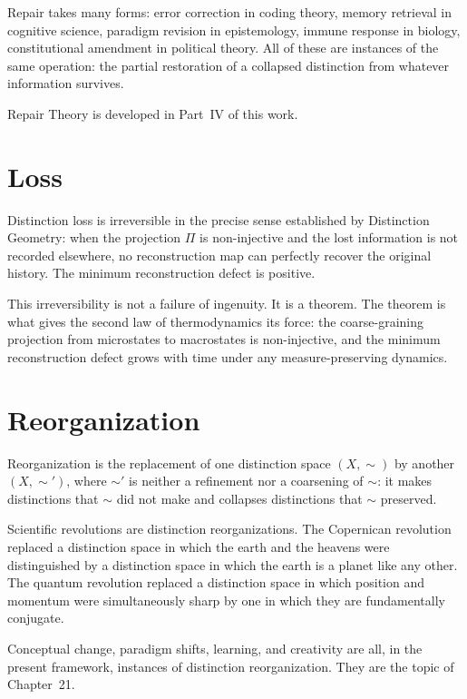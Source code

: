 \documentclass[12pt,a4paper]{book}
\theoremstyle{remark}
\theoremstyle{definition}
\begin{document}
Repair takes many forms: error correction in coding theory, memory
retrieval in cognitive science, paradigm revision in epistemology,
immune response in biology, constitutional amendment in political theory.
All of these are instances of the same operation: the partial restoration
of a collapsed distinction from whatever information survives.

Repair Theory is developed in Part~IV of this work.

\section{Loss}

Distinction loss is irreversible in the precise sense established by
Distinction Geometry: when the projection $\Pi$ is non-injective and the
lost information is not recorded elsewhere, no reconstruction map can
perfectly recover the original history. The minimum reconstruction defect
is positive.

This irreversibility is not a failure of ingenuity. It is a theorem. The
theorem is what gives the second law of thermodynamics its force: the
coarse-graining projection from microstates to macrostates is non-injective,
and the minimum reconstruction defect grows with time under any
measure-preserving dynamics.

\section{Reorganization}

Reorganization is the replacement of one distinction space $(X, \sim)$
by another $(X, \sim')$, where $\sim'$ is neither a refinement nor a
coarsening of $\sim$: it makes distinctions that $\sim$ did not make and
collapses distinctions that $\sim$ preserved.

Scientific revolutions are distinction reorganizations. The Copernican
revolution replaced a distinction space in which the earth and the heavens
were distinguished by a distinction space in which the earth is a planet
like any other. The quantum revolution replaced a distinction space in
which position and momentum were simultaneously sharp by one in which
they are fundamentally conjugate.

Conceptual change, paradigm shifts, learning, and creativity are all,
in the present framework, instances of distinction reorganization. They
are the topic of Chapter~21.

\end{document}
